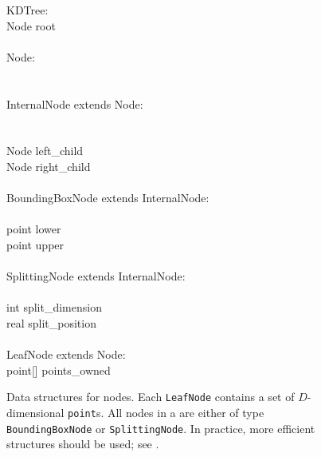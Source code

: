 \begin{figure}
  \begin{pcode}
      \class KDTree: \\
      \> Node root \\
      \\
      \class Node: \\
      \>  \\
      \\
      \class InternalNode extends Node: \\
      \>  \\
      \>  \\
      \> Node left\_child \\
      \> Node right\_child \\
      \\
      \class BoundingBoxNode extends InternalNode: \\
      \>  \\
      \> point lower \\
      \> point upper \\
      \\
      \class SplittingNode extends InternalNode: \\
      \>  \\
      \> int  split\_dimension \\
      \> real split\_position \\
      \\
      \class LeafNode extends Node: \\
      \> point[] points\_owned
  \end{pcode}
  \caption{Data structures for \kdtree nodes.
    Each {\tt LeafNode} contains a set of $D$-dimensional {\tt point}s.
    All nodes in a \kdtree are either of type {\tt BoundingBoxNode} or
    {\tt SplittingNode}.
    In practice, more efficient structures should be used; see .}
  \label{code:datastruct}
\end{figure}

